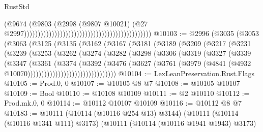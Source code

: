 \begin{lexlean}{RustStd}
\begin{coremodule}
                                                                                        (@9674
                                                                                          (@9803
                                                                                            (@2998
                                                                                              (@9807
                                                                                                @10021)
                                                                                              (@27
                                                                                                @2997))))))))))))))))))))))))))))))))))))))))))))))
@10103 := @2996
    (@3035
      (@3053
        (@3063
          (@3125
            (@3135
              (@3162
                (@3167
                  (@3181
                    (@3189
                      (@3209
                        (@3217
                          (@3231
                            (@3239
                              (@3253
                                (@3262
                                  (@3274
                                    (@3282
                                      (@3298
                                        (@3306
                                          (@3319
                                            (@3327
                                              (@3339
                                                (@3347
                                                  (@3361
                                                    (@3374
                                                      (@3392
                                                        (@3476
                                                          (@3627
                                                            (@3761
                                                              (@3979
                                                                (@4841
                                                                  (@4932
                                                                    @10070))))))))))))))))))))))))))))))))
@10104 := LexLeanPreservation.Rust.Flags
@10105 := Prod.{0, 0}
@10107 := @10105 @8 @7
@10108 := @10105 @10107
@10109 := Bool
@10110 := @10108 @10109
@10111 := @2 @10110
@10112 := Prod.mk.{0, 0}
@10114 := @10112 @10107 @10109
@10116 := @10112 @8 @7
@10183 := @10111
    (@10114 (@10116 @254 @13) @3144)
    (@10111
      (@10114 (@10116 @1341 @111) @3173)
      (@10111
        (@10114 (@10116 @1941 @1943) @3173)

\end{coremodule}
\end{lexlean}
